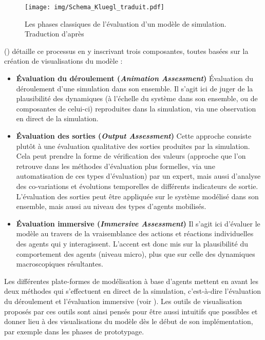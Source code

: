 \documentclass[a4paper, 12pt]{article}
\begin{document}
\begin{figure}[H]
	\centering
	\texttt{[image: img/Schema\_Kluegl\_traduit.pdf]}
	\caption{Les phases classiques de l'évaluation d'un modèle de simulation.
		Traduction d'après \textcite[fig.~1, \ppno~42]{klugl_validation_2008}}
	\label{fig:schema-kluegl}
\end{figure}

\medskip
{} (\citeyear[\ppno~41--42]{klugl_validation_2008}) détaille ce processus en y inscrivant trois composantes, toutes basées sur la création de visualisations du modèle :\\
\begin{itemize}
	\item \textbf{Évaluation du déroulement (\textit{Animation Assessment})} Évaluation du déroulement d'une simulation dans son ensemble.
	Il s'agit ici de juger de la plausibilité des dynamiques (à l'échelle du système dans son ensemble, ou de composantes de celui-ci) reproduites dans la simulation, via une observation en direct de la simulation.
	
	\item \textbf{Évaluation des sorties (\textit{Output Assessment})} Cette approche consiste plutôt à une évaluation qualitative des sorties produites par la simulation.
	Cela peut prendre la forme de vérification des valeurs (approche que l'on retrouve dans les méthodes d'évaluation plus formelles, via une automatisation de ces types d'évaluation) par un expert, mais aussi d'analyse des co-variations et évolutions temporelles de différents indicateurs de sortie.
	L'évaluation des sorties peut être appliquée sur le système modélisé dans son ensemble, mais aussi au niveau des types d'agents mobilisés.
	
	\item \textbf{Évaluation \og immersive\fg{} (\textit{Immersive Assessment})} Il s'agit ici d'évaluer le modèle au travers de la vraisemblance des actions et réactions individuelles des agents qui y interagissent. L'accent est donc mis sur la plausibilité du comportement des agents (niveau micro), plus que sur celle des dynamiques macroscopiques résultantes.
\end{itemize}
\medskip
Les différentes plate-formes de modélisation à base d'agents mettent en avant les deux méthodes qui s'effectuent \og en direct\fg{} de la simulation, c'est-à-dire l'évaluation du déroulement et l'évaluation immersive (voir ).
Les outils de visualisation proposés par ces outils sont ainsi pensés pour être aussi intuitifs que possibles et donner lieu à des visualisations du modèle dès le début de son implémentation, par exemple dans les phases de prototypage.
\end{document}
